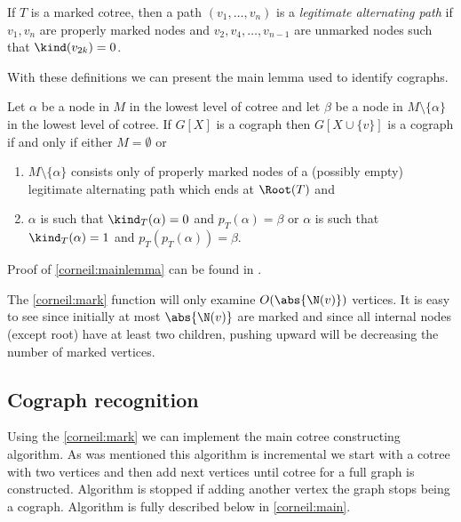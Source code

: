 \begin{defi}
    If $T$ is a marked cotree, then a path $(v_1, \ldots, v_n)$ is a \emph{legitimate alternating path} if $v_1, v_n$ are properly marked nodes and $v_2, v_4, \ldots, v_{n-1}$ are unmarked nodes such that $\kind(v_{2k}) = 0$.
\end{defi}

With these definitions we can present the main lemma used to identify cographs.

\begin{lemma}
    \label{corneil:mainlemma}
    Let $\alpha$ be a node in $M$ in the lowest level of cotree and let $\beta$ be a node in $M \setminus \{\alpha\}$ in the lowest level of cotree. If $G[X]$ is a cograph then $G[X \cup \{v\}]$ is a cograph if and only if either $M = \emptyset$ or
    \begin{enumerate}
        \item $M \setminus \{\alpha\}$ consists only of properly marked nodes of a (possibly empty) legitimate alternating path which ends at $\Root(T)$ and
        \item $\alpha$ is such that $\kind_T(\alpha) = 0$ and $p_T(\alpha) = \beta$ or $\alpha$ is such that $\kind_T(\alpha) = 1$ and $p_T(p_T(\alpha)) = \beta$.
    \end{enumerate}
\end{lemma}

Proof of \ref{corneil:mainlemma} can be found in \cite{corneil}.

The \ref{corneil:mark} function will only examine $O(\abs{\N(v)})$ vertices. It is easy to see since initially at most $\abs{\N(v)}$ are marked and since all internal nodes (except root) have at least two children, pushing upward will be decreasing the number of marked vertices.

\subsection{Cograph recognition}

Using the \ref{corneil:mark} we can implement the main cotree constructing algorithm. As was mentioned this algorithm is incremental we start with a cotree with two vertices and then add next vertices until cotree for a full graph is constructed. Algorithm is stopped if adding another vertex the graph stops being a cograph. Algorithm is fully described below in \ref{corneil:main}.

